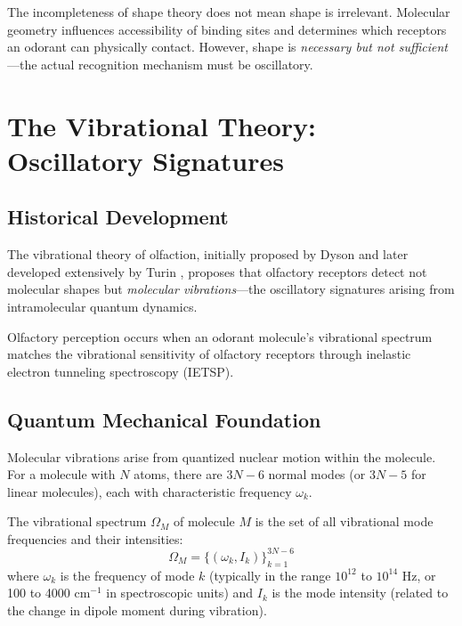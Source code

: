 \begin{remark}
The incompleteness of shape theory does not mean shape is irrelevant. Molecular geometry influences accessibility of binding sites and determines which receptors an odorant can physically contact. However, shape is \textit{necessary but not sufficient}—the actual recognition mechanism must be oscillatory.
\end{remark}

\section{The Vibrational Theory: Oscillatory Signatures}

\subsection{Historical Development}

The vibrational theory of olfaction, initially proposed by Dyson \cite{dyson1938scientific} and later developed extensively by Turin \cite{turin1996spectroscopic,turin2002mechanism}, proposes that olfactory receptors detect not molecular shapes but \textit{molecular vibrations}—the oscillatory signatures arising from intramolecular quantum dynamics.

\begin{principle}
\label{prin:vibrational_recognition}
Olfactory perception occurs when an odorant molecule's vibrational spectrum matches the vibrational sensitivity of olfactory receptors through inelastic electron tunneling spectroscopy (IETSP).
\end{principle}

\subsection{Quantum Mechanical Foundation}

Molecular vibrations arise from quantized nuclear motion within the molecule. For a molecule with $N$ atoms, there are $3N - 6$ normal modes (or $3N - 5$ for linear molecules), each with characteristic frequency $\omega_k$.

\begin{definition}
\label{def:vibrational_spectrum}
The vibrational spectrum $\Omega_M$ of molecule $M$ is the set of all vibrational mode frequencies and their intensities:
\begin{equation}
\Omega_M = \{(\omega_k, I_k)\}_{k=1}^{3N-6}
\end{equation}
where $\omega_k$ is the frequency of mode $k$ (typically in the range $10^{12}$ to $10^{14}$ Hz, or 100 to 4000 cm$^{-1}$ in spectroscopic units) and $I_k$ is the mode intensity (related to the change in dipole moment during vibration).
\end{definition}

